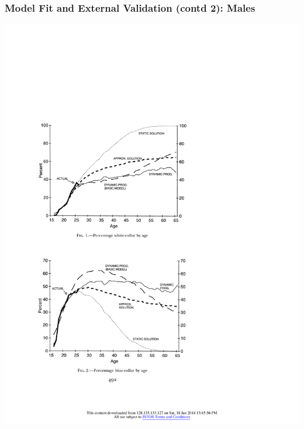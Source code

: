 \begin{frame}
	\frametitle{Model Fit and External Validation (contd 2): Males}
	\begin{center}
	\includegraphics[width=.9\textwidth]{tab-figs/figure2_1997}
	\end{center}
\end{frame}

